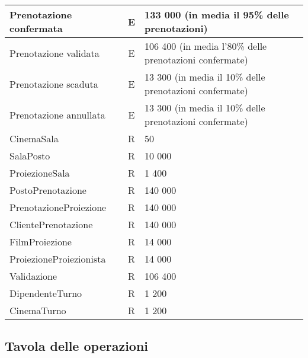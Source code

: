 \begin{tabularx}{\linewidth}{|l|c|X|}
    Prenotazione confermata
     & E
     & 133 000 (in media il 95\% delle prenotazioni)
    \\ \hline
    Prenotazione validata
     & E
     & 106 400 (in media l'80\% delle prenotazioni confermate)
    \\ \hline
    Prenotazione scaduta
     & E
     & 13 300 (in media il 10\% delle prenotazioni confermate)
    \\ \hline
    Prenotazione annullata
     & E
     & 13 300 (in media il 10\% delle prenotazioni confermate)
    \\ \hline
    CinemaSala
     & R
     & 50
    \\ \hline
    SalaPosto
     & R
     & 10 000
    \\ \hline
    ProiezioneSala
     & R
     & 1 400
    \\ \hline
    PostoPrenotazione
     & R
     & 140 000
    \\ \hline
    PrenotazioneProiezione
     & R
     & 140 000
    \\ \hline
    ClientePrenotazione
     & R
     & 140 000
    \\ \hline
    FilmProiezione
     & R
     & 14 000
    \\ \hline
    ProiezioneProiezionista
     & R
     & 14 000
    \\ \hline
    Validazione
     & R
     & 106 400
    \\ \hline
    DipendenteTurno
     & R
     & 1 200
    \\ \hline
    CinemaTurno
     & R
     & 1 200
    \\ \hline
\end{tabularx}

\pagebreak
\subsection*{Tavola delle operazioni}
%
%

